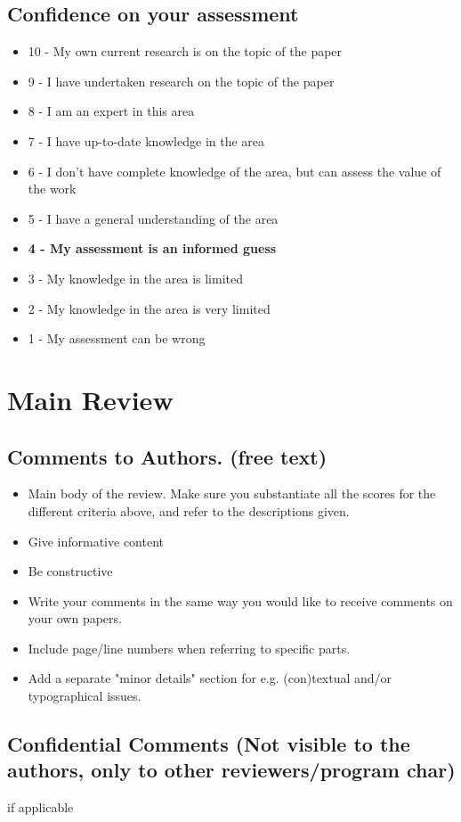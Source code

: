 \documentclass[a4paper]{article}
\begin{document}
\subsection{Confidence on your assessment}

\begin{itemize}
	\item 10 - My own current research is on the topic of the paper
	\item 9 - I have undertaken research on the topic of the paper
	\item 8 - I am an expert in this area
	\item 7 - I have up-to-date knowledge in the area
	\item 6 - I don't have complete knowledge of the area, but can assess the value of the work
	\item 5 - I have a general understanding of the area
	\item \textbf{4 - My assessment is an informed guess}
	\item 3 - My knowledge in the area is limited
	\item 2 - My knowledge in the area is very limited
	\item 1 - My assessment can be wrong
\end{itemize}

\section{Main Review}

\subsection{Comments to Authors. (free text)}

\begin{itemize}
	\item Main body of the review. Make sure you substantiate all the scores for the different criteria above, and refer to the descriptions given.
	\item Give informative content
	\item Be constructive
	\item Write your comments in the same way you would like to receive comments on your own papers.
	\item Include page/line numbers when referring to specific parts.
	\item Add a separate "minor details" section for e.g. (con)textual and/or typographical issues.
\end{itemize}


\subsection{Confidential Comments (Not visible to the authors, only to other reviewers/program char)}

if applicable



 
\end{document}
